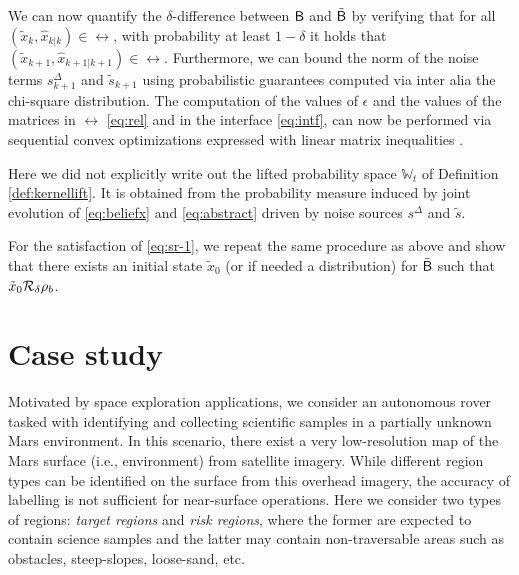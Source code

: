 \documentclass{ifacconf}
\newcommand{\red}[1]{{\color{red} #1}}
\renewcommand{\axx}[1]{{\color{orange} Ali: #1}}
\begin{document}
We can now quantify the $\delta$-difference between $\mathsf{B}$ and $\tilde {\mathsf{B}}$ by verifying that for all  $(\tilde x_k,\hat x_{k|k})\in \rel$, with probability at least $1-\delta$ it holds that $(\tilde x_{k+1},\hat x_{k+1|k+1})\in \rel$. %
Furthermore, we can bound the norm of the noise terms ${s}^\Delta_{k+1}$ and $ \tilde{{s}}_{k+1}$ using probabilistic guarantees computed via inter alia the chi-square distribution. The computation of the values of $\epsilon$ and the values of the matrices  in $\rel$ \eqref{eq:rel} and in the interface \eqref{eq:intf}, can now be performed via sequential convex optimizations expressed with linear matrix inequalities \citep{haesaert2017verification}.


\begin{remark}
  Here we did not explicitly write out the lifted probability space $\mathbb{W}_t$ of Definition \ref{def:kernellift}. It is obtained from the probability measure induced by joint evolution of \eqref{eq:beliefx} and \eqref{eq:abstract} driven by noise sources $s^\Delta$ and $ {\tilde{s}} $.
 \end{remark}


For the satisfaction of \eqref{eq:sr-1}, we repeat the same procedure as above and show that there exists an initial state $\tilde x_{0}$ (or if needed a distribution) for $\tilde {\mathsf{B}}$ such that  $\tilde x_{0} \relax\mathcal{R}_\delta \rho_b$.


\section{Case study}\label{sec:case}
Motivated by space exploration applications, we consider an autonomous rover tasked with identifying and collecting scientific samples in a partially unknown Mars environment. In this scenario, there exist a very low-resolution map of the Mars surface (i.e., environment) from satellite imagery. While different region types can be identified on the surface from this overhead imagery, the accuracy of labelling is not sufficient for near-surface operations. Here we consider two types of regions: \emph{target regions} and \emph{risk regions}, where the former are expected to contain science samples and the latter may contain non-traversable areas such as obstacles, steep-slopes, loose-sand, etc.
\end{document}
